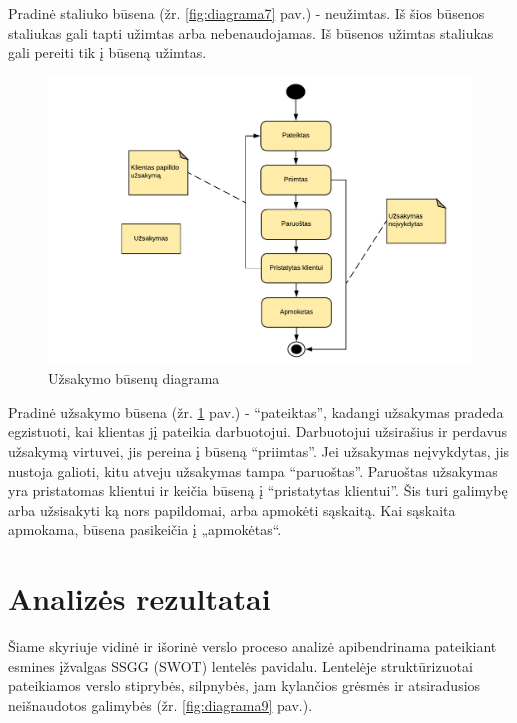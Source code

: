 \documentclass{VUMIFPSkursinis}
\begin{document}
Pradinė  staliuko  būsena (žr. \ref{fig:diagrama7} pav.)  - neužimtas.  Iš  šios  būsenos  staliukas  gali  tapti  užimtas  arba nebenaudojamas. Iš būsenos užimtas staliukas gali pereiti tik į būseną užimtas. 



	\begin {figure}[H]
	\centering
		
		\includegraphics[scale=0.9]{img/3lab/Diagrama8}
		\caption{Užsakymo būsenų diagrama}
		\label{fig:diagrama8}
	\end{figure}

Pradinė užsakymo būsena (žr. \ref{fig:diagrama8} pav.) - “pateiktas”, kadangi užsakymas pradeda egzistuoti, kai klientas jį pateikia darbuotojui. Darbuotojui užsirašius ir perdavus užsakymą virtuvei, jis pereina į būseną “priimtas”. Jei užsakymas neįvykdytas, jis nustoja galioti, kitu atveju užsakymas  tampa “paruoštas”. Paruoštas užsakymas yra pristatomas klientui ir keičia būseną į “pristatytas klientui”. Šis turi galimybę arba užsisakyti ką nors papildomai, arba apmokėti sąskaitą. Kai sąskaita apmokama, būsena pasikeičia į „apmokėtas“.\\
\section{Analizės rezultatai}

Šiame skyriuje vidinė ir išorinė verslo proceso analizė apibendrinama pateikiant esmines įžvalgas SSGG (SWOT) lentelės pavidalu. Lentelėje struktūrizuotai pateikiamos verslo stiprybės, silpnybės, jam kylančios grėsmės ir atsiradusios neišnaudotos galimybės (žr. \ref{fig:diagrama9} pav.).
\end{document}
